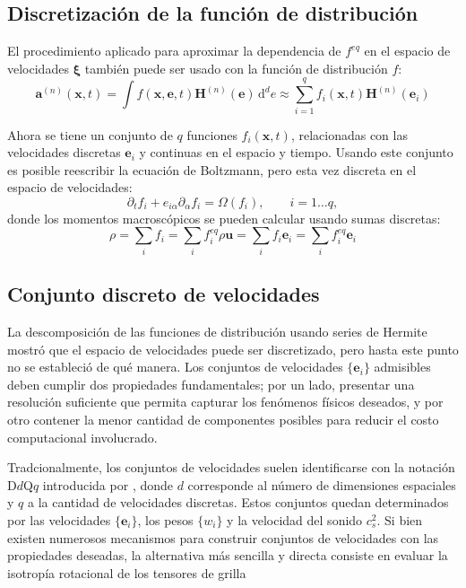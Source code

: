 \subsection{Discretizaci\'on de la funci\'on de distribuci\'on}
El procedimiento aplicado para aproximar la dependencia de $f^{eq}$ en el espacio de velocidades $\bm{\xi}$ tambi\'en puede ser usado con la funci\'on de distribuci\'on $f$:
\begin{equation}
	\bm{a}^{(n)}(\bm{x},t) = \int f(\bm{x}, \bm{e}, t) \bm{H}^{(n)}(\bm{e}) \, \mbox{d}^d e \approx \sum_{i=1}^q f_i(\bm{x},t)\bm{H}^{(n)}(\bm{e}_i)
\end{equation}

Ahora se tiene un conjunto de $q$ funciones $f_i(\bm{x},t)$, relacionadas con las velocidades discretas $\bm{e}_i$ y continuas en el espacio y tiempo. Usando este conjunto es posible reescribir la ecuaci\'on de Boltzmann, pero esta vez discreta en el espacio de velocidades:
\begin{equation}
	\partial_t f_i + e_{i\alpha} \partial_{\alpha} f_{i} = \Omega(f_i), \qquad i=1\ldots q,
\end{equation}
donde los momentos macrosc\'opicos se pueden calcular usando sumas discretas:
\begin{subequations}
	\begin{equation}
		\rho        = \sum_i f_i          = \sum_i f_i^{eq}
	\end{equation}
	\begin{equation}
		\rho \bm{u} = \sum_i f_i\bm{e}_i  = \sum_i f_i^{eq}\bm{e}_i
	\end{equation}
\end{subequations}


\subsection{Conjunto discreto de velocidades}
La descomposici\'on de las funciones de distribuci\'on usando series de Hermite mostr\'o que el espacio de velocidades puede ser discretizado, pero hasta este punto no se estableci\'o de qu\'e manera. Los conjuntos de velocidades $\{\bm{e}_i\}$ admisibles deben cumplir dos propiedades fundamentales; por un lado, presentar una resoluci\'on suficiente que permita capturar los fen\'omenos f\'isicos deseados, y por otro contener la menor cantidad de componentes posibles para reducir el costo computacional involucrado. 
\par 
Tradcionalmente, los conjuntos de velocidades suelen identificarse con la notaci\'on D$d$Q$q$ introducida por \cite{qian_lattice_1992}, donde $d$ corresponde al n\'umero de dimensiones espaciales y $q$ a la cantidad de velocidades discretas. Estos conjuntos quedan determinados por las velocidades $\{\bm{e}_i\}$, los pesos $\{w_i\}$ y la velocidad del sonido $c_s^2$. Si bien existen numerosos mecanismos para construir conjuntos de velocidades con las propiedades deseadas, la alternativa m\'as sencilla y directa consiste en evaluar la isotrop\'ia rotacional de los tensores de grilla \cite{guo_lattice_2013,frisch_lattice_1987}